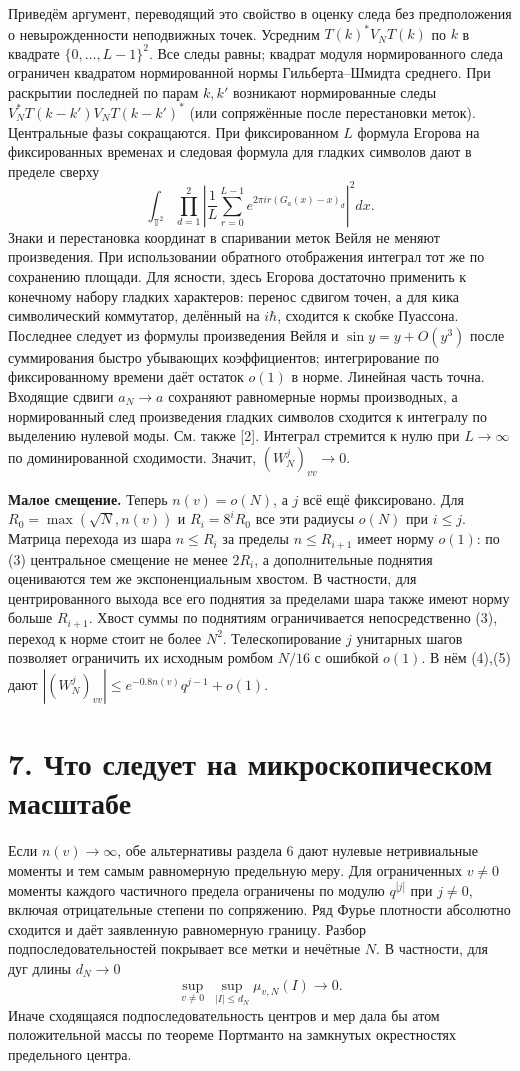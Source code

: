 \documentclass[11pt,a4paper]{article}
\newcommand{\sect}[1]{\section*{\sffamily\color{ink}#1}}
\newcommand{\subt}[1]{\par\medskip\noindent\textbf{#1.}\quad}
\begin{document}
Приведём аргумент, переводящий это свойство в оценку следа без предположения о невырожденности неподвижных точек. Усредним $T(k)^* V_N T(k)$ по $k$ в квадрате $\{0,\ldots,L-1\}^2$. Все следы равны; квадрат модуля нормированного следа ограничен квадратом нормированной нормы Гильберта--Шмидта среднего. При раскрытии последней по парам $k,k'$ возникают нормированные следы $V_N^*T(k-k')V_N T(k-k')^*$ (или сопряжённые после перестановки меток). Центральные фазы сокращаются. При фиксированном $L$ формула Егорова на фиксированных временах и следовая формула для гладких символов дают в пределе сверху
\[
 \int_{\mathbb T^2}\prod_{d=1}^2
 \left|\frac1L\sum_{r=0}^{L-1}e^{2\pi i r (G_a(x)-x)_d}\right|^2 dx .
\]
Знаки и перестановка координат в спаривании меток Вейля не меняют произведения. При использовании обратного отображения интеграл тот же по сохранению площади. Для ясности, здесь Егорова достаточно применить к конечному набору гладких характеров: перенос сдвигом точен, а для кика символический коммутатор, делённый на $i\hbar$, сходится к скобке Пуассона. Последнее следует из формулы произведения Вейля и $\sin y=y+O(y^3)$ после суммирования быстро убывающих коэффициентов; интегрирование по фиксированному времени даёт остаток $o(1)$ в норме. Линейная часть точна. Входящие сдвиги $a_N\to a$ сохраняют равномерные нормы производных, а нормированный след произведения гладких символов сходится к интегралу по выделению нулевой моды. См. также [2]. Интеграл стремится к нулю при $L\to\infty$ по доминированной сходимости. Значит, $(W_N^j)_{vv}\to0$.

\subt{Малое смещение} Теперь $n(v)=o(N)$, а $j$ всё ещё фиксировано. Для $R_0=\max(\sqrt N,n(v))$ и $R_i=8^iR_0$ все эти радиусы $o(N)$ при $i\le j$. Матрица перехода из шара $n\le R_i$ за пределы $n\le R_{i+1}$ имеет норму $o(1)$: по (3) центральное смещение не менее $2R_i$, а дополнительные поднятия оцениваются тем же экспоненциальным хвостом. В частности, для центрированного выхода все его поднятия за пределами шара также имеют норму больше $R_{i+1}$. Хвост суммы по поднятиям ограничивается непосредственно (3), переход к норме стоит не более $N^2$. Телескопирование $j$ унитарных шагов позволяет ограничить их исходным ромбом $N/16$ с ошибкой $o(1)$. В нём (4),(5) дают $|(W_N^j)_{vv}|\le e^{-0.8n(v)}q^{j-1}+o(1)$.
\newpage
\sect{7. Что следует на микроскопическом масштабе}
Если $n(v)\to\infty$, обе альтернативы раздела 6 дают нулевые нетривиальные моменты и тем самым равномерную предельную меру. Для ограниченных $v\ne0$ моменты каждого частичного предела ограничены по модулю $q^{|j|}$ при $j\ne0$, включая отрицательные степени по сопряжению. Ряд Фурье плотности абсолютно сходится и даёт заявленную равномерную границу. Разбор подпоследовательностей покрывает все метки и нечётные $N$. В частности, для дуг длины $d_N\to0$
\[
 \sup_{v\ne0}\ \sup_{|I|\le d_N} \mu_{v,N}(I)\to0.                       \tag{10}
\]
Иначе сходящаяся подпоследовательность центров и мер дала бы атом положительной массы по теореме Портманто на замкнутых окрестностях предельного центра.
\end{document}

